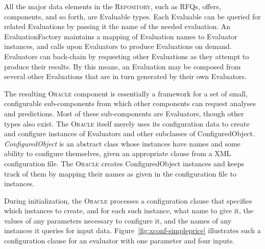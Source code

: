 \documentclass{article}
\begin{document}
All the major data elements in the \textsc{Repository}, such as RFQs, offers, components, and so forth, are Evaluable types.  Each Evaluable can be queried for related Evaluations by passing it the name of the needed evaluation.  An EvaluationFactory maintains a mapping of Evaluation names to Evaluator instances, and calls upon Evaluators to produce Evaluations on demand.  Evaluators can back-chain by requesting other Evaluations as they attempt to produce their results.  By this means, an Evaluation may be composed from several other Evaluations that are in turn generated by their own Evaluators.

The resulting \textsc{Oracle} component is essentially a framework for a set of small, configurable sub-components from which other components can request analyses and predictions.  Most of these sub-components are Evaluators, though other types also exist.  The \textsc{Oracle} itself merely uses its configuration data to create and configure instances of Evaluators and other subclasses of ConfiguredObject.  \emph{ConfiguredObject} is an abstract class whose instances have names and some ability to configure themselves, given an appropriate clause from a XML configuration file.  The \textsc{Oracle} creates ConfiguredObject instances and keeps track of them by mapping their names as given in the configuration file to instances.

During initialization, the \textsc{Oracle} processes a configuration clause that specifies which instances to create, and for each such instance, what name to give it, the values of any parameters necessary to configure it, and the names of any instances it queries for input data.  Figure~\ref{fig:xconf-simpleprice} illustrates such a configuration clause for an evaluator with one parameter and four inputs.
\end{document}
